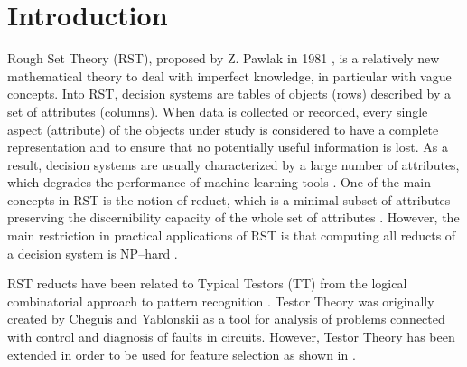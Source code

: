 \documentclass[number,preprint,review,12pt]{elsarticle}
\begin{document}
\section{Introduction}
  Rough Set Theory (RST), proposed by Z. Pawlak in 1981 \citep{Pawlak81}, %
  is a relatively new mathematical theory to deal with imperfect knowledge, in particular with vague 
  concepts. Into RST, decision systems are tables of objects (rows) described by a set of attributes (columns). 
  When data is collected or recorded, every single aspect (attribute) of the objects under study is considered to have a complete representation and to ensure that no potentially useful information is lost. As a result, decision systems are usually characterized by a large number of attributes, which degrades the performance of machine learning tools \citep{Parthalain08}. One of the main concepts in RST is the notion of reduct, which is a minimal subset of attributes preserving the discernibility capacity of the whole set of attributes \citep{Pawlak91}. However, the main restriction in practical applications of RST is that computing all reducts of a decision system is NP--hard \citep{Skowron92}. 
   
  RST reducts have been related to Typical Testors (TT) from the logical combinatorial approach to pattern recognition \citep{Chikalov2013}. Testor Theory was originally created by Cheguis and Yablonskii \cite{Cheguis55} as a tool for analysis of problems connected with control and diagnosis of faults in circuits.  However, Testor Theory has been extended in order to be used for feature selection as shown in \citep{Ruiz08}.%

  
\end{document}
